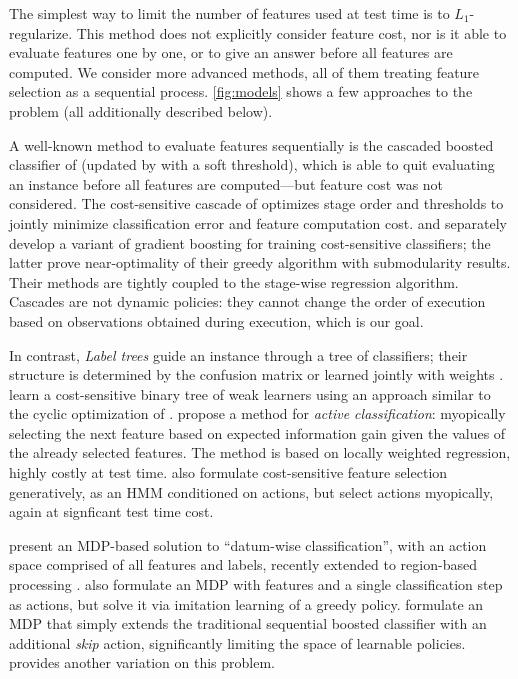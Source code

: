 The simplest way to limit the number of features used at test time is to $L_1$-regularize.
This method does not explicitly consider feature cost, nor is it able to evaluate features one by one, or to give an answer before all features are computed.
We consider more advanced methods, all of them treating feature selection as a sequential process.
\autoref{fig:models} shows a few approaches to the problem (all additionally described below).

A well-known method to evaluate features sequentially is the cascaded boosted classifier of \cite{Viola-IJCV-2004} (updated by \cite{Bourdev-CVPR-2005} with a soft threshold), which is able to quit evaluating an instance before all features are computed---but feature cost was not considered.
The cost-sensitive cascade of \cite{Chen-AISTATS-2012} optimizes stage order and thresholds to jointly minimize classification error and feature computation cost.
\cite{Xu-ICML-2012} and \cite{Grubb-AISTATS-2012} separately develop a variant of gradient boosting for training cost-sensitive classifiers; the latter prove near-optimality of their greedy algorithm with submodularity results.
Their methods are tightly coupled to the stage-wise regression algorithm.
Cascades are not dynamic policies: they cannot change the order of execution based on observations obtained during execution, which is our goal.

In contrast, \emph{Label trees} guide an instance through a tree of classifiers; their structure is determined by the confusion matrix or learned jointly with weights \parencite{Deng-NIPS-2011}.
\cite{Xu-ICML-2013} learn a cost-sensitive binary tree of weak learners using an approach similar to the cyclic optimization of \parencite{Chen-AISTATS-2012}.
\cite{Gao-NIPS-2011} propose a method for \emph{active classification}: myopically selecting the next feature based on expected information gain given the values of the already selected features.
The method is based on locally weighted regression, highly costly at test time.
\cite{Ji-PR-2007} also formulate cost-sensitive feature selection generatively, as an HMM conditioned on actions, but select actions myopically, again at signficant test time cost.

\cite{DulacArnold-ML-2012} present an MDP-based solution to ``datum-wise classification'', with an action space comprised of all features and labels, recently extended to region-based processing \parencite{DulacArnold-ICLR-2014}.
\cite{HeHe-ICMLW-2012} also formulate an MDP with features and a single classification step as actions, but solve it via imitation learning of a greedy policy.
\cite{Benbouzid-ICML-2012} formulate an MDP that simply extends the traditional sequential boosted classifier with an additional \emph{skip} action, significantly limiting the space of learnable policies.
\cite{Trapeznikov-ML-2012} provides another variation on this problem.

